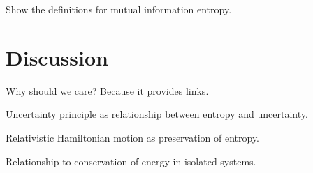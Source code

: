 \documentclass[aps,pra,10pt,twocolumn,floatfix,nofootinbib]{revtex4-1}
\begin{document}
Show the definitions for mutual information entropy.

\section{Discussion}

Why should we care? Because it provides links.

Uncertainty principle as relationship between entropy and uncertainty.

Relativistic Hamiltonian motion as preservation of entropy.

Relationship to conservation of energy in isolated systems.

\begin{thebibliography}{0}
	
\end{thebibliography}
\end{document}
